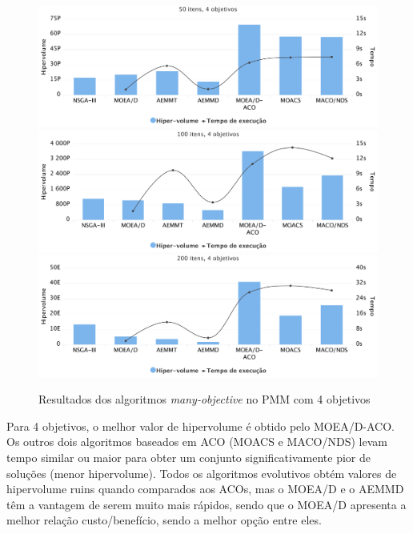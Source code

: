 \begin{figure}[!htbp]
	\includegraphics[width=1\textwidth]{cap_experimentos/figs/etapa4/i50o4}
	\includegraphics[width=1\textwidth]{cap_experimentos/figs/etapa4/i100o4}
	\includegraphics[width=1\textwidth]{cap_experimentos/figs/etapa4/i200o4}
	\caption{\label{fig_exp4_mkp_o4}Resultados dos algoritmos \textit{many-objective} no PMM com 4 objetivos}
\end{figure}

Para 4 objetivos, o melhor valor de hipervolume é obtido pelo MOEA/D-ACO. Os outros dois algoritmos baseados em ACO (MOACS e MACO/NDS) levam tempo similar ou maior para obter um conjunto significativamente pior de soluções (menor hipervolume). Todos os algoritmos evolutivos obtém valores de hipervolume ruins quando comparados aos ACOs, mas o MOEA/D e o AEMMD têm a vantagem de serem muito mais rápidos, sendo que o MOEA/D apresenta a melhor relação custo/benefício, sendo a melhor opção entre eles.

